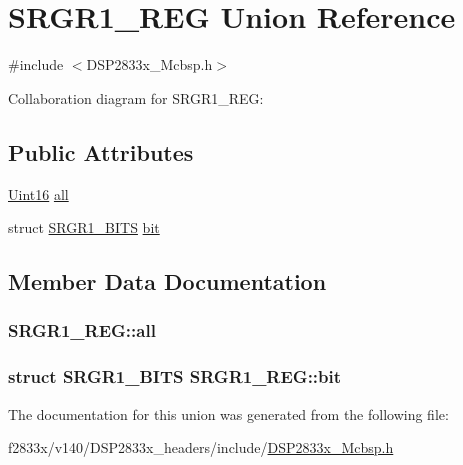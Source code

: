 \hypertarget{union_s_r_g_r1___r_e_g}{}\section{S\+R\+G\+R1\+\_\+\+R\+E\+G Union Reference}
\label{union_s_r_g_r1___r_e_g}


{\ttfamily \#include $<$D\+S\+P2833x\+\_\+\+Mcbsp.\+h$>$}



Collaboration diagram for S\+R\+G\+R1\+\_\+\+R\+E\+G\+:
\subsection*{Public Attributes}
\begin{DoxyCompactItemize}
\item 
\hyperlink{_d_s_p2833x___device_8h_a59a9f6be4562c327cbfb4f7e8e18f08b}{Uint16} \hyperlink{union_s_r_g_r1___r_e_g_ae6e182897e279e039ef992eb95906b12}{all}
\item 
struct \hyperlink{struct_s_r_g_r1___b_i_t_s}{S\+R\+G\+R1\+\_\+\+B\+I\+T\+S} \hyperlink{union_s_r_g_r1___r_e_g_a691a0bda4acec94c96075b9bf44ac7fb}{bit}
\end{DoxyCompactItemize}


\subsection{Member Data Documentation}
\hypertarget{union_s_r_g_r1___r_e_g_ae6e182897e279e039ef992eb95906b12}{}
\subsubsection[{all}]{ S\+R\+G\+R1\+\_\+\+R\+E\+G\+::all}\label{union_s_r_g_r1___r_e_g_ae6e182897e279e039ef992eb95906b12}
\hypertarget{union_s_r_g_r1___r_e_g_a691a0bda4acec94c96075b9bf44ac7fb}{}
\subsubsection[{bit}]{\setlength{\rightskip}{0pt plus 5cm}struct {\bf S\+R\+G\+R1\+\_\+\+B\+I\+T\+S} S\+R\+G\+R1\+\_\+\+R\+E\+G\+::bit}\label{union_s_r_g_r1___r_e_g_a691a0bda4acec94c96075b9bf44ac7fb}


The documentation for this union was generated from the following file\+:\begin{DoxyCompactItemize}
\item 
f2833x/v140/\+D\+S\+P2833x\+\_\+headers/include/\hyperlink{_d_s_p2833x___mcbsp_8h}{D\+S\+P2833x\+\_\+\+Mcbsp.\+h}\end{DoxyCompactItemize}
